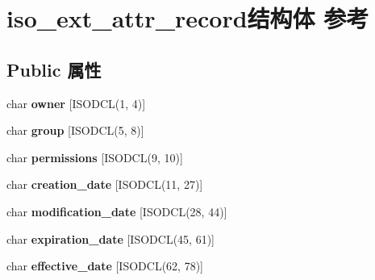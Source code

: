 \hypertarget{structiso__ext__attr__record}{}\section{iso\+\_\+ext\+\_\+attr\+\_\+record结构体 参考}
\label{structiso__ext__attr__record}
\subsection*{Public 属性}
\begin{DoxyCompactItemize}
\item 
\mbox{\label{structiso__ext__attr__record_a55d4d2e3004a578f2afecd5a015c0e1f}} 
char {\bfseries owner} \mbox{[}I\+S\+O\+D\+CL(1, 4)\mbox{]}
\item 
\mbox{\label{structiso__ext__attr__record_a387b19ac3a7685f4586c7151ac85b1f8}} 
char {\bfseries group} \mbox{[}I\+S\+O\+D\+CL(5, 8)\mbox{]}
\item 
\mbox{\label{structiso__ext__attr__record_aa65d62bcceb3c90be63de68c7f19d894}} 
char {\bfseries permissions} \mbox{[}I\+S\+O\+D\+CL(9, 10)\mbox{]}
\item 
\mbox{\label{structiso__ext__attr__record_a61a6a357eed8fb3dd2e848b9e0ddc0f7}} 
char {\bfseries creation\+\_\+date} \mbox{[}I\+S\+O\+D\+CL(11, 27)\mbox{]}
\item 
\mbox{\label{structiso__ext__attr__record_aa1397aa87009867ba6a92eda07115c21}} 
char {\bfseries modification\+\_\+date} \mbox{[}I\+S\+O\+D\+CL(28, 44)\mbox{]}
\item 
\mbox{\label{structiso__ext__attr__record_a32f641ce028db43a037cc1dcb164a291}} 
char {\bfseries expiration\+\_\+date} \mbox{[}I\+S\+O\+D\+CL(45, 61)\mbox{]}
\item 
\mbox{\label{structiso__ext__attr__record_a7f647b804a8ccf23ef0ef70fab5274fb}} 
char {\bfseries effective\+\_\+date} \mbox{[}I\+S\+O\+D\+CL(62, 78)\mbox{]}
\item 
\mbox{\label{structiso__ext__attr__record_af96a39f53007e2512885f0e4ce767a72}} 

\end{DoxyCompactItemize}
